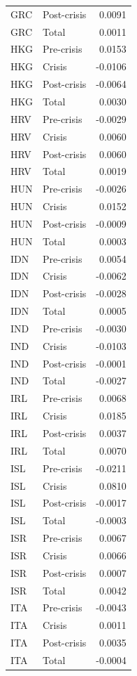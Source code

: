 \begin{longtable}[t]{llr}
\addlinespace
GRC & Post-crisis & 0.0091\\
GRC & Total & 0.0011\\
HKG & Pre-crisis & 0.0153\\
HKG & Crisis & -0.0106\\
HKG & Post-crisis & -0.0064\\
\addlinespace
HKG & Total & 0.0030\\
HRV & Pre-crisis & -0.0029\\
HRV & Crisis & 0.0060\\
HRV & Post-crisis & 0.0060\\
HRV & Total & 0.0019\\
\addlinespace
HUN & Pre-crisis & -0.0026\\
HUN & Crisis & 0.0152\\
HUN & Post-crisis & -0.0009\\
HUN & Total & 0.0003\\
IDN & Pre-crisis & 0.0054\\
\addlinespace
IDN & Crisis & -0.0062\\
IDN & Post-crisis & -0.0028\\
IDN & Total & 0.0005\\
IND & Pre-crisis & -0.0030\\
IND & Crisis & -0.0103\\
\addlinespace
IND & Post-crisis & -0.0001\\
IND & Total & -0.0027\\
IRL & Pre-crisis & 0.0068\\
IRL & Crisis & 0.0185\\
IRL & Post-crisis & 0.0037\\
\addlinespace
IRL & Total & 0.0070\\
ISL & Pre-crisis & -0.0211\\
ISL & Crisis & 0.0810\\
ISL & Post-crisis & -0.0017\\
ISL & Total & -0.0003\\
\addlinespace
ISR & Pre-crisis & 0.0067\\
ISR & Crisis & 0.0066\\
ISR & Post-crisis & 0.0007\\
ISR & Total & 0.0042\\
ITA & Pre-crisis & -0.0043\\
\addlinespace
ITA & Crisis & 0.0011\\
ITA & Post-crisis & 0.0035\\
ITA & Total & -0.0004\\

\end{longtable}
